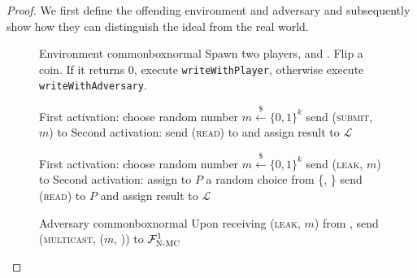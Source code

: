   \begin{proof}
    We first define the offending environment and adversary and subsequently
    show how they can distinguish the ideal from the real world.
    \begin{figure}[H]
      \begin{titlebox}{Environment \normalfont \perfectenv}{commonbox}{normal}
        Spawn two players, \alice{} and \bob. Flip a coin. If it returns 0,
        execute \texttt{writeWithPlayer}, otherwise execute
        \texttt{writeWithAdversary}.
        \begin{algorithmic}[1]
            \State First activation:
            \Indent
              \State choose random number $m \overset{\$}{\gets} \{0, 1\}^k$
              \State send (\textsc{submit}, $m$) to \alice
            \EndIndent
            \State Second activation:
            \Indent
              \State send (\textsc{read}) to \bob{} and assign result to
              $\mathcal{L}$
                \State {} 
              \Else
                \State {} 
              \EndIf
            \EndIndent
          \EndProcedure
          \Statex

            \State First activation:
            \Indent
              \State choose random number $m \overset{\$}{\gets} \{0, 1\}^k$
              \State send (\textsc{leak}, $m$) to \adversary{} 
            \EndIndent
            \State Second activation:
            \Indent
              \State assign to $P$ a random choice from \{\alice, \bob\}
              \State send (\textsc{read}) to $P$ and assign result to
              $\mathcal{L}$
                \State {} 
              \Else
                \State {} 
              \EndIf
            \EndIndent
          \EndProcedure
        \end{algorithmic}
      \end{titlebox}
      \caption{}
      \label{fig:perfectledger:env}
    \end{figure}

    \begin{figure}[H]
      \begin{titlebox}{Adversary \normalfont \perfectadv}{commonbox}{normal}
        Upon receiving (\textsc{leak}, $m$) from \perfectenv, send
        (\textsc{multicast}, ($m$, \alice)) to $\mathcal{F}_{\textsc{N-MC}}^1$
      \end{titlebox}
      \caption{}
      \label{fig:perfectledger:adv}
    \end{figure}

  \end{proof}
